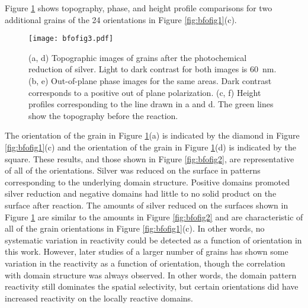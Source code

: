 Figure \ref{fig:bfofig3} shows  topography,  phase, and height profile comparisons for two additional grains of the 24 orientations in Figure \ref{fig:bfofig1}(c).
\begin{figure}
		\texttt{[image: bfofig3.pdf]}
		\caption[Scanning probe data for additional grains]{%
			(a, d) Topographic images of  grains after the 
			photochemical reduction of silver. Light to dark contrast 
			for both images is \SI{60}{\nano\meter}. (b, e) Out-of-plane 
			 phase images for the same areas. Dark contrast corresponds 
			to a positive out of plane polarization. (c, f) Height profiles 
			corresponding to the line drawn in a and d. The green lines 
			show the topography before the reaction.}
		\label{fig:bfofig3}
\end{figure}
The orientation of the grain in Figure \ref{fig:bfofig3}(a) is indicated by the diamond in Figure \ref{fig:bfofig1}(c) and the orientation of the grain in Figure \ref{fig:bfofig3}(d) is indicated by the square. These results, and those shown in Figure \ref{fig:bfofig2}, are representative of all of the orientations. Silver was reduced on the surface in patterns corresponding to the underlying domain structure. Positive domains promoted silver reduction and negative domains had little to no solid product on the surface after reaction. The amounts of silver reduced on the surfaces shown in Figure \ref{fig:bfofig3} are similar to the amounts in Figure \ref{fig:bfofig2} and are characteristic of all of the grain orientations in Figure \ref{fig:bfofig1}(c). In other words, no systematic variation in reactivity could be detected as a function of orientation in this work. However, later studies of a larger number of grains has shown some variation in the reactivity as a function of orientation, though the correlation with domain structure was always observed. In other words, the domain pattern reactivity still dominates the spatial selectivity, but certain orientations did have increased reactivity on the locally reactive domains.



